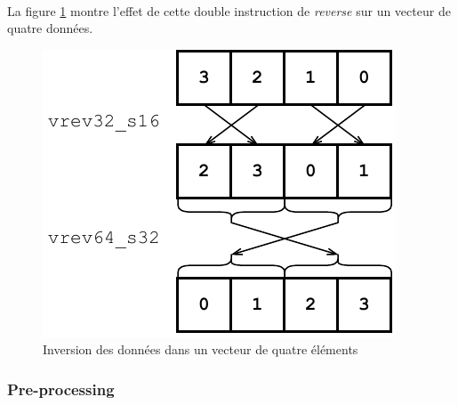 \documentclass{article}
\begin{document}
    \paragraph{}
    La figure \ref{fig:double-reverse} montre l'effet de cette double instruction de \emph{reverse} sur un vecteur de quatre données.
    \begin{figure}[H]
        \centering
        \includegraphics[width=.3\linewidth]{./images/double-reverse.pdf}
        \caption{Inversion des données dans un vecteur de quatre éléments}
        \label{fig:double-reverse}
    \end{figure}


    \subsubsection{Pre-processing}
\end{document}
